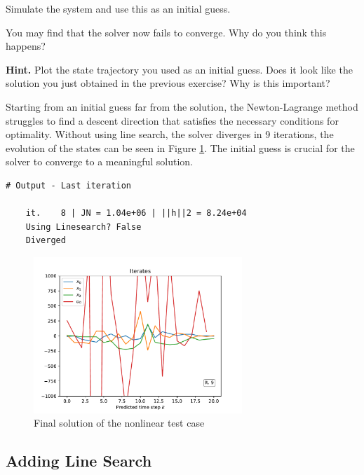 \documentclass[]{article}
\begin{document}
\begin{assignment} \label{assgn:simulate-init}
   Simulate the system and use this as an initial guess.

   You may find that the solver now fails to converge. 
   Why do you think this happens? 
   
   \textbf{Hint.} Plot the state trajectory you used as an initial guess. 
   Does it look like the solution you just obtained in the previous exercise? 
   Why is this important?
\end{assignment}
\begin{flushleft}
	Starting from an initial guess far from the solution, the Newton-Lagrange method struggles to find a descent direction that satisfies the necessary conditions for optimality.
	Without using line search, the solver diverges in 9 iterations, the evolution of the states can be seen in Figure \ref{fig:assignment6_3}.
	The initial guess is crucial for the solver to converge to a meaningful solution.
\end{flushleft}
\begin{lstlisting}[style=python]
	# Output - Last iteration

	it.    8 | JN = 1.04e+06 | ||h||2 = 8.24e+04
	Using Linesearch? False
	Diverged
\end{lstlisting}
\begin{figure}[H]
	\centering
	\includegraphics[width=0.7\textwidth]{images/Assignment6-3.pdf}
	\caption{Final solution of the nonlinear test case}
	\label{fig:assignment6_3}
\end{figure}



\subsection{Adding Line Search}
\end{document}
